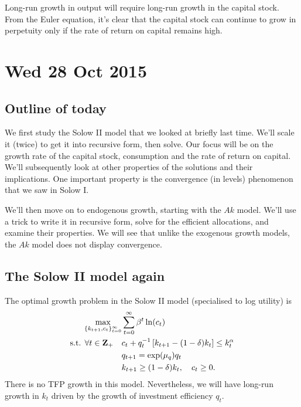 \documentclass[11pt,letterpaper,reqno,oneside]{article}
\begin{document}
Long-run growth in output will require long-run growth in the capital stock. From the Euler equation, it's clear that the capital stock can continue to grow in perpetuity only if the rate of return on capital remains high.



\pagebreak
\section{Wed 28 Oct 2015}
\label{sec:28Oct2015}


\subsection{Outline of today}
\label{sec:28Oct2015:outline_of_today}

We first study the Solow II model that we looked at briefly last time. We'll scale it (twice) to get it into recursive form, then solve. Our focus will be on the growth rate of the capital stock, consumption and the rate of return on capital. We'll subsequently look at other properties of the solutions and their implications. One important property is the convergence (in levels) phenomenon that we saw in Solow I.

We'll then move on to endogenous growth, starting with the $Ak$ model. We'll use a trick to write it in recursive form, solve for the efficient allocations, and examine their properties. We will see that unlike the exogenous growth models, the $Ak$ model does not display convergence.



\subsection{The Solow II model again}
\label{sec:28Oct2015:Solow_II_again}

The optimal growth problem in the Solow II model (specialised to log utility) is
%
\begin{align*}
	\max_{\{k_{t+1},c_t\}_{t=0}^\infty} 
	&\sum_{t=0}^\infty \beta^t \ln(c_t)
	\\
	\text{s.t. $\forall t \in \mathbf{Z}_+$}\quad
	&c_t + q_t^{-1} \left[ k_{t+1} - (1-\delta) k_t \right]
	\leq k_t^\alpha 
	\\
	& q_{t+1} = \exp(\mu_q) q_t
	\\
	&k_{t+1} \geq (1-\delta)k_t , \quad c_t \geq 0 .
\end{align*}
%
There is no TFP growth in this model. Nevertheless, we will have long-run growth in $k_t$ driven by the growth of investment efficiency $q_t$.
\end{document}
